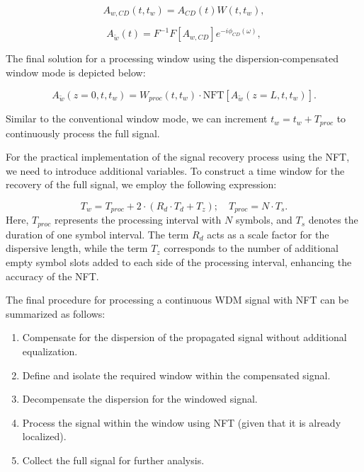 \begin{equation}
A_{w, CD}(t, t_w) = A_{CD}(t) W(t, t_w) {,}
\end{equation}

\begin{equation}
A_{\tilde{w}}(t) = F^{-1}F[A_{w, CD}]e^{-i\phi_{CD}(\omega)} {,}
\end{equation}

The final solution for a processing window using the dispersion-compensated window mode is depicted below:

\begin{equation}
A_{\tilde{w}}(z = 0, t, t_w) = W_{proc}(t, t_w) \cdot \mathrm{NFT}[A_{\tilde{w}}(z = L, t, t_w)] {.}
\end{equation}

Similar to the conventional window mode, we can increment $t_w = t_w + T_{proc}$ to continuously process the full signal.

For the practical implementation of the signal recovery process using the NFT, we need to introduce additional variables. To construct a time window for the recovery of the full signal, we employ the following expression:

\begin{equation}
T_w = T_{proc} + 2 \cdot (R_d \cdot T_d + T_z) {;} \quad T_{proc} = N \cdot T_s {.}
\end{equation}
%
Here, $T_{proc}$ represents the processing interval with $N$ symbols, and $T_s$ denotes the duration of one symbol interval. The term $R_d$ acts as a scale factor for the dispersive length, while the term $T_z$ corresponds to the number of additional empty symbol slots added to each side of the processing interval, enhancing the accuracy of the NFT.

The final procedure for processing a continuous WDM signal with NFT can be summarized as follows:

\begin{enumerate}
\item Compensate for the dispersion of the propagated signal without additional equalization.
\item Define and isolate the required window within the compensated signal.
\item Decompensate the dispersion for the windowed signal.
\item Process the signal within the window using NFT (given that it is already localized).
\item Collect the full signal for further analysis.
\end{enumerate}


